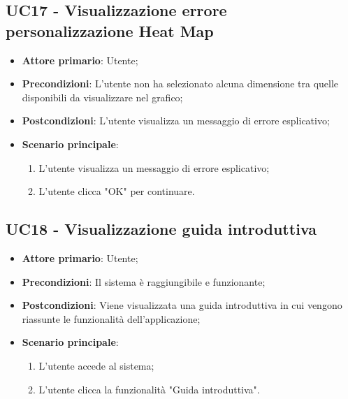 \subsection{UC17 - Visualizzazione errore personalizzazione Heat Map}
\begin{itemize}
	\item \textbf{Attore primario}: Utente;
	\item \textbf{Precondizioni}: L'utente non ha selezionato alcuna dimensione tra quelle disponibili da visualizzare nel grafico;
	\item \textbf{Postcondizioni}: L'utente visualizza un messaggio di errore esplicativo;
	\item \textbf{Scenario principale}:
		\begin{enumerate}
			\item L'utente visualizza un messaggio di errore esplicativo;
			\item L'utente clicca "OK" per continuare.
		\end{enumerate}
\end{itemize}

\subsection{UC18 - Visualizzazione guida introduttiva}
\begin{itemize}
	\item \textbf{Attore primario}: Utente;
	\item \textbf{Precondizioni}: Il sistema è raggiungibile e funzionante;
	\item \textbf{Postcondizioni}: Viene visualizzata una guida introduttiva in cui vengono riassunte le funzionalità dell'applicazione;
	\item \textbf{Scenario principale}:
		\begin{enumerate}
			\item L'utente accede al sistema;
			\item L'utente clicca la funzionalità "Guida introduttiva".
		\end{enumerate}
\end{itemize}